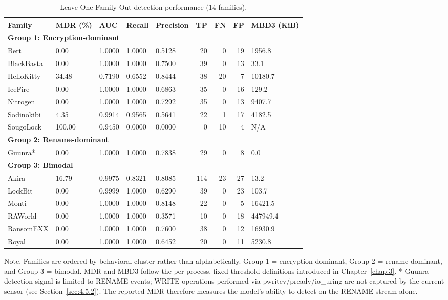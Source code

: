 \begin{table}[htbp]
\centering
\caption{Leave-One-Family-Out detection performance (14 families).}\label{tab:4-4}
\begin{adjustbox}{max width=\textwidth}
\footnotesize
\begin{tabular}{lllllrrrl}
\hline
\textbf{Family} & \textbf{MDR (\%)} & \textbf{AUC} & \textbf{Recall} & \textbf{Precision} & \textbf{TP} & \textbf{FN} & \textbf{FP} & \textbf{MBD3 (KiB)} \\
\hline
\multicolumn{9}{l}{\textbf{Group 1: Encryption-dominant}} \\
Bert & 0.00 & 1.0000 & 1.0000 & 0.5128 & 20 & 0 & 19 & 1956.8 \\
BlackBasta & 0.00 & 1.0000 & 1.0000 & 0.7500 & 39 & 0 & 13 & 33.1 \\
HelloKitty & 34.48 & 0.7190 & 0.6552 & 0.8444 & 38 & 20 & 7 & 10180.7 \\
IceFire & 0.00 & 1.0000 & 1.0000 & 0.6863 & 35 & 0 & 16 & 129.2 \\
Nitrogen & 0.00 & 1.0000 & 1.0000 & 0.7292 & 35 & 0 & 13 & 9407.7 \\
Sodinokibi & 4.35 & 0.9914 & 0.9565 & 0.5641 & 22 & 1 & 17 & 4182.5 \\
SougoLock & 100.00 & 0.9450 & 0.0000 & 0.0000 & 0 & 10 & 4 & N/\allowbreak{}A \\
\multicolumn{9}{l}{\textbf{Group 2: Rename-dominant}} \\
Guunra* & 0.00 & 1.0000 & 1.0000 & 0.7838 & 29 & 0 & 8 & 0.0 \\
\multicolumn{9}{l}{\textbf{Group 3: Bimodal}} \\
Akira & 16.79 & 0.9975 & 0.8321 & 0.8085 & 114 & 23 & 27 & 13.2 \\
LockBit & 0.00 & 0.9999 & 1.0000 & 0.6290 & 39 & 0 & 23 & 103.7 \\
Monti & 0.00 & 1.0000 & 1.0000 & 0.8148 & 22 & 0 & 5 & 16421.5 \\
RAWorld & 0.00 & 1.0000 & 1.0000 & 0.3571 & 10 & 0 & 18 & 447949.4 \\
RansomEXX & 0.00 & 1.0000 & 1.0000 & 0.7600 & 38 & 0 & 12 & 16930.9 \\
Royal & 0.00 & 1.0000 & 1.0000 & 0.6452 & 20 & 0 & 11 & 5230.8 \\
\hline
\end{tabular}
\end{adjustbox}
\end{table}

Note. Families are ordered by behavioral cluster rather than alphabetically. Group 1 = encryption-dominant, Group 2 = rename-dominant, and Group 3 = bimodal. MDR and MBD3 follow the per-process, fixed-threshold definitions introduced in Chapter~\ref{chap:3}. * Guunra detection signal is limited to RENAME events; WRITE operations performed via pwritev/\allowbreak{}preadv/\allowbreak{}io\_\allowbreak{}uring are not captured by the current sensor (see Section~\ref{sec:4.5.2}). The reported MDR therefore measures the model's ability to detect on the RENAME stream alone.

